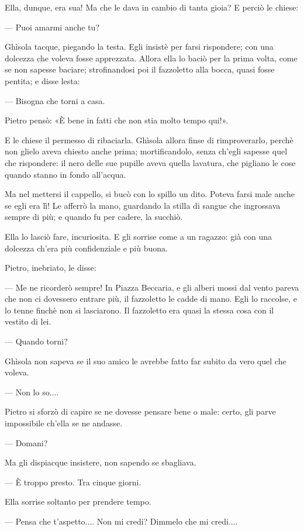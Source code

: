 Ella, dunque, era sua! Ma che le dava in cambio di tanta gioia? E perciò le chiese:

— Puoi amarmi anche tu?

Ghìsola tacque, piegando la testa. Egli insistè per farsi rispondere; con una dolcezza che voleva fosse apprezzata. Allora ella lo baciò per la prima volta, come se non sapesse baciare; strofinandosi poi il fazzoletto alla bocca, quasi fosse pentita; e disse lesta:

— Bisogna che torni a casa.

Pietro pensò: «È bene in fatti che non stia molto tempo qui!».

E le chiese il permesso di ribaciarla. Ghìsola allora finse di rimproverarlo, perchè non glielo aveva chiesto anche prima; mortificandolo, senza ch’egli sapesse quel che rispondere: il nero delle sue pupille aveva quella lavatura, che pigliano le cose quando stanno in fondo all’acqua.

Ma nel mettersi il cappello, si bucò con lo spillo un dito. Poteva farsi male anche se egli era lì! Le afferrò la mano, guardando la stilla di sangue che ingrossava sempre di più; e quando fu per cadere, la succhiò.

Ella lo lasciò fare, incuriosita. E gli sorrise come a un ragazzo: già con una dolcezza ch’era più confidenziale e più buona.

Pietro, inebriato, le disse:

— Me ne ricorderò sempre! In Piazza Beccaria, e gli alberi mossi dal vento pareva che non ci dovessero entrare più, il fazzoletto le cadde di mano. Egli lo raccolse, e lo tenne finchè non si lasciarono. Il fazzoletto era quasi la stessa cosa con il vestito di lei.

— Quando torni?

Ghìsola non sapeva se il suo amico le avrebbe fatto far subito da vero quel che voleva.

— Non lo so....

Pietro si sforzò di capire se ne dovesse pensare bene o male: certo, gli parve impossibile ch’ella se ne andasse.

— Domani?

Ma gli dispiacque insistere, non sapendo se sbagliava.

— È troppo presto. Tra cinque giorni.

Ella sorrise soltanto per prendere tempo.

— Pensa che t’aspetto.... Non mi credi? Dimmelo che mi credi....

